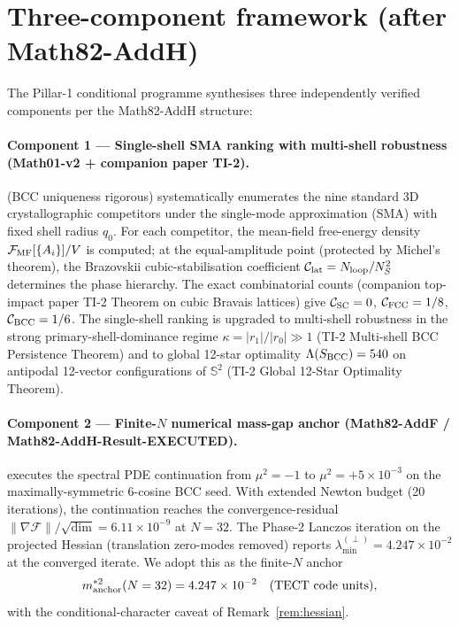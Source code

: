 \section{Three-component framework (after Math82-AddH)}\label{sec:three-component}

The Pillar-1 conditional programme synthesises three independently
verified components per the Math82-AddH structure:

\paragraph{Component 1 — Single-shell SMA ranking with multi-shell
robustness (Math01-v2 + companion paper TI-2).}
\cite{Math01v2} (BCC uniqueness rigorous) systematically enumerates
the nine standard 3D crystallographic competitors under the
single-mode approximation (SMA) with fixed shell radius $q_0$. For
each competitor, the mean-field free-energy density
$\mathcal{F}_{\rm MF}[\{A_i\}]/V$ is computed; at the
equal-amplitude point (protected by Michel's theorem), the
Brazovskii cubic-stabilisation coefficient
$\mathcal{C}_{\rm lat} = N_{\rm loop}/N_S^2$ determines the
phase hierarchy. The exact combinatorial counts (companion top-impact
paper TI-2 Theorem on cubic Bravais lattices) give $\mathcal{C}_{\rm SC}
= 0$, $\mathcal{C}_{\rm FCC} = 1/8$, $\mathcal{C}_{\rm BCC} = 1/6$.
The single-shell ranking is upgraded to multi-shell robustness in the
strong primary-shell-dominance regime $\kappa = |r_1|/|r_0| \gg 1$
(TI-2 Multi-shell BCC Persistence Theorem) and to global 12-star
optimality $\Lambda(S_{\rm BCC}) = 540$ on antipodal 12-vector
configurations of $\mathbb{S}^2$ (TI-2 Global 12-Star Optimality
Theorem).

\paragraph{Component 2 — Finite-$N$ numerical mass-gap anchor
(Math82-AddF / Math82-AddH-Result-EXECUTED).}
\cite{Math82AddF} executes the spectral PDE continuation from
$\mu^2 = -1$ to $\mu^2 = +5 \times 10^{-3}$ on the
maximally-symmetric 6-cosine BCC seed. With extended Newton budget
(20 iterations), the continuation reaches the convergence-residual
$\|\nabla\mathcal{F}\|/\sqrt{\dim} = 6.11 \times 10^{-9}$ at
$N = 32$. The Phase-2 Lanczos iteration on the projected Hessian
(translation zero-modes removed) reports $\lambda_{\min}^{(\perp)}
= 4.247 \times 10^{-2}$ at the converged iterate. We adopt this as
the finite-$N$ anchor
\[
m^{*2}_{\rm anchor}(N=32) = 4.247 \times 10^{-2} \quad \text{(TECT
code units)},
\]
with the conditional-character caveat of
Remark~\ref{rem:hessian}.


